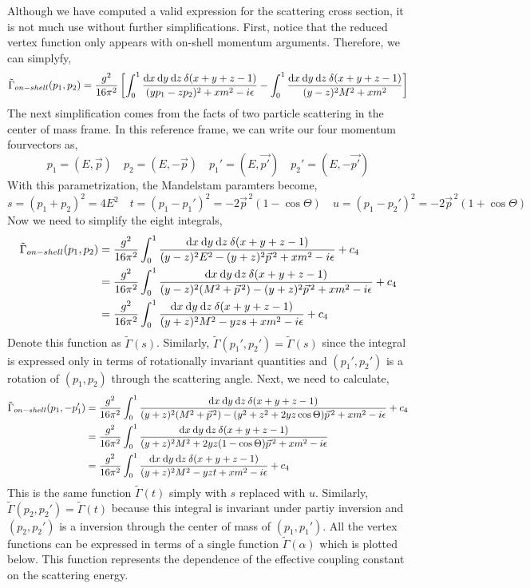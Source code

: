 \documentclass{article}
\begin{document}
Although we have computed a valid expression for the scattering cross section, it is not much use without further simplifications. First, notice that the reduced vertex function only appears with on-shell momentum arguments. Therefore, we can simplyfy,
\[\tilde{\Gamma}_{on-shell}(p_1, p_2) = \frac{ g^2}{16 \pi^2} \left[ \int_0^1 \frac{\mathrm{d}x \: \mathrm{d}y \: \mathrm{d}z \: \delta(x + y + z - 1)}{(y p_1 - z p_2)^2 + x m^2 - i \epsilon} - \int_0^1 \frac{\mathrm{d}x \: \mathrm{d}y \: \mathrm{d}z \: \delta(x + y + z - 1)}{(y - z)^2 M^2 + x m^2} \right]\]
The next simplification comes from the facts of two particle scattering in the center of mass frame. In this reference frame, we can write our four momentum fourvectors as,
\[ p_1 = (E, \vec{p}) \quad p_2 = (E, -\vec{p}) \quad p_1' = (E, \vec{p'}) \quad p_2' = (E, -\vec{p'}) \]
With this parametrization, the Mandelstam paramters become,
\[ s = (p_1 + p_2)^2 = 4 E^2 \quad t = (p_1 - p_1')^2 = -2 \vec{p}^{\, 2} (1 - \cos{\Theta}) \quad u = (p_1 - p_2')^2 = -2 \vec{p}^{\, 2} (1 + \cos{\Theta}) \]
Now we need to simplify the eight integrals,
\begin{align*} 
\tilde{\Gamma}_{on-shell}(p_1, p_2) &= \frac{g^2}{16 \pi^2} \int_0^1 \frac{\mathrm{d}x \: \mathrm{d}y \: \mathrm{d}z \: \delta(x + y + z - 1)}{(y - z)^2 E^2 - (y + z)^2 \vec{p}^{\, 2} + x m^2 - i \epsilon} + c_4
\\
& = \frac{g^2}{16 \pi^2} \int_0^1 \frac{\mathrm{d}x \: \mathrm{d}y \: \mathrm{d}z \: \delta(x + y + z - 1) }{(y - z)^2 (M^2 + \vec{p}^{\, 2}) - (y + z)^2 \vec{p}^{\, 2} + x m^2 - i \epsilon} + c_4
\\
& = \frac{g^2}{16 \pi^2} \int_0^1 \frac{ \mathrm{d}x \: \mathrm{d}y \: \mathrm{d}z \: \delta(x + y + z - 1) }{(y + z)^2 M^2 - yz s + x m^2 - i \epsilon} + c_4
\end{align*}
Denote this function as $\tilde{\Gamma}(s)$.
Similarly, $\tilde{\Gamma}(p_1', p_2') = \tilde{\Gamma}(s)$ since the integral is expressed only in terms of rotationally invariant quantities and $(p_1', p_2')$ is a rotation of $(p_1, p_2)$ through the scattering angle.
Next, we need to calculate, 
\begin{align*} 
\tilde{\Gamma}_{on-shell}(p_1, -p_1') &= \frac{g^2}{16 \pi^2} \int_0^1 \frac{\mathrm{d}x \: \mathrm{d}y \: \mathrm{d}z \: \delta(x + y + z - 1)}{(y + z)^2 (M^2 + \vec{p}^{\, 2}) - (y^2 + z^2 + 2 yz \cos{\Theta}) \vec{p}^{\, 2}+ x m^2 - i \epsilon} + c_4 
\\
& = \frac{g^2}{16 \pi^2} \int_0^1 \frac{\mathrm{d}x \: \mathrm{d}y \: \mathrm{d}z \: \delta(x + y + z - 1)}{(y + z)^2 M^2 + 2yz(1 - \cos{\Theta})\vec{p}^{\, 2} + x m^2 - i \epsilon}
\\
& = \frac{g^2}{16 \pi^2} \int_0^1 \frac{\mathrm{d}x \: \mathrm{d}y \: \mathrm{d}z \: \delta(x + y + z - 1) }{(y + z)^2M^2 - yz t + x m^2 - i \epsilon} + c_4
\end{align*}
This is the same function $\tilde{\Gamma}(t)$ simply with $s$ replaced with $u$. Similarly, $\tilde{\Gamma}(p_2, p_2') = \tilde{\Gamma}(t)$ because this integral is invariant under partiy inversion and $(p_2, p_2')$ is a inversion through the center of mass of $(p_1, p_1')$.
All the vertex functions can be expressed in terms of a single function $\tilde{\Gamma}(\alpha)$ which is plotted below. This function represents the dependence of the effective coupling constant on the scattering energy.
\end{document}
